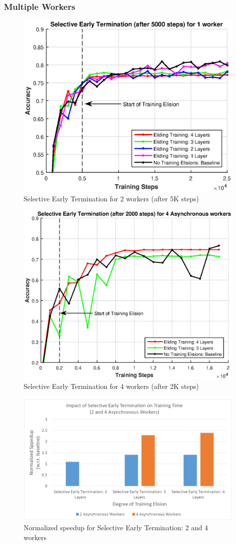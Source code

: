 \subsubsection{Multiple Workers}
\begin{figure}[t]
	\centering
	\includegraphics[width=0.8\columnwidth]{figures/fig6.eps}
	\caption{Selective Early Termination for 2 workers (after 5K steps)}
	\label{fig:fig8}
\end{figure}
\begin{figure}[t]
	\centering
	\includegraphics[width=0.8\columnwidth]{figures/fig9.eps}
	\caption{Selective Early Termination for 4 workers (after 2K steps)}
	\label{fig:fig9}
\end{figure}
\begin{figure}[t]
	\centering
	\includegraphics[width=0.8\columnwidth]{figures/fig10.PNG}
	\caption{Normalized speedup for Selective Early Termination: 2 and 4 workers}
	\label{fig:fig10}
\end{figure}

